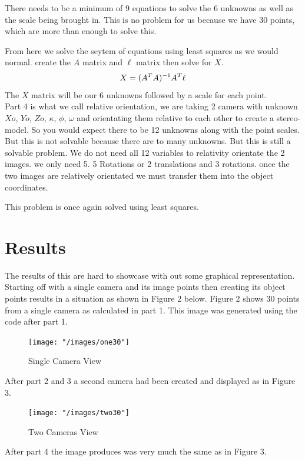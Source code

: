 \documentclass[12pt,a4paper]{article}
\begin{document}
	There needs to be a minimum of 9 equations to solve the 6 unknowns as well as the scale being brought in. This is no problem for us because we have 30 points, which are more than enough to solve this.
	
	From here we solve the seytem of equations using least squares as we would normal. create the $A$ matrix and $\ell$ matrix then solve for $X$.
	\begin{equation}\notag
	X = (A^T A)^{-1} A^T\ell
	\end{equation}
	The $X$ matrix will be our 6 unknowns followed by a scale for each point.\\
	
	Part 4 is what we call relative orientation, we are taking 2 camera with unknown $Xo$, $Yo$, $Zo$, $\kappa$, $\phi$, $\omega$ and orientating them relative to each other to create a stereo-model. So you would expect there to be 12 unknowns along with the point scales. But this is not solvable because there are to many unknowns. But this is still a solvable problem.
	We do not need all 12 variables to relativity orientate the 2 images. we only need 5. 5 Rotations or 2 translations and 3 rotations. once the two images are relatively orientated we must transfer them into the object coordinates.
	
	This problem is once again solved using least squares.
	
	\newpage
	\section{Results}
	
	The results of this are hard to showcase with out some graphical representation. Starting off with a single camera and its image points then creating its object points results in a situation as shown in Figure 2 below. Figure 2 shows 30 points from a single camera as calculated in part 1. This image was generated using the code after part 1. 
	
	\begin{figure}[H]
		\centering
		\texttt{[image: "/images/one30"]}
		\caption{Single Camera View}
		\label{fig:oneimage}
	\end{figure}
	
	After part 2 and 3 a second camera had been created and displayed as in Figure 3.
		
	\begin{figure}[H]
		\centering
		\texttt{[image: "/images/two30"]}
		\caption{Two Cameras View }
		\label{fig:twoimages}
	\end{figure}
	
	After part 4 the image produces was very much the same as in Figure 3.
	
\end{document}
